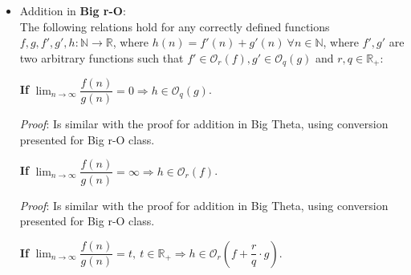 \begin{itemize}
\begin{proof}
$ \lim_{n\to\infty} \dfrac{f(n)}{g(n)} = t \Rightarrow \lim_{n\to\infty} \dfrac{f'(n)}{g'(n)} = t \cdot \dfrac{r}{q} = t' \Rightarrow \lim_{n\to\infty} \dfrac{g'(n) + f'(n)}{g'(n)} = t' + 1 $ and using the result from asymptotic analysis section, we have $ g'(n) + f'(n) = h(n) \in \Theta_{t' + 1}(g')$. \\ 
Using reflexivity property, $ h(n) \in \Theta_{t' + 1} (q \cdot g)$. \\
Using the conversion technique, we have $ h(n) \in \Theta_{r}( \dfrac{1}{r} \cdot t \cdot \dfrac{r}{q} + 1) \cdot q \cdot g)$. \\
By swapping back $t$, asymptotically, we can establish: $ h(n) \in \Theta_{r}( \dfrac{1}{r} \cdot ( \dfrac{f(n)}{g(n)} \cdot \dfrac{r}{q} + 1) \cdot q \cdot g)$ \\
Therefore $ h \in \Theta_{r} \left( f + \dfrac{r}{q} \cdot g \right) $.
\end{proof} 



  \item Addition in \textbf{Big r-O}: \\
The following relations hold for any correctly defined functions $f, g, f', g', h:\mathbb{N}\longrightarrow\mathbb{R}$, where $ h(n) = f'(n) + g'(n)\  \forall n \in \mathbb{N} $, where $f',g'$ are two arbitrary functions such that $ f' \in \mathcal{O}_{r}(f),  g' \in \mathcal{O}_{q}(g) $ and $r,q \in \mathbb{R}_{+}$:  
\begin{theorem} 
    \textbf{If} $ \lim_{n\to\infty} \dfrac{f(n)}{g(n)} = 0 \Rightarrow  h \in \mathcal{O}_{q}(g) $. \\
\end{theorem} 

\textit{Proof}: 
Is similar with the proof for addition in Big Theta, using conversion presented for Big r-O class.
\hfill\break

\begin{theorem} 
  \textbf{If} $ \lim_{n\to\infty} \dfrac{f(n)}{g(n)} = \infty \Rightarrow  h \in \mathcal{O}_{r}(f) $. \\
\end{theorem} 

  \textit{Proof}:
Is similar with the proof for addition in Big Theta, using conversion presented for Big r-O class.
\hfill\break
\begin{theorem} 
  \textbf{If} $ \lim_{n\to\infty} \dfrac{f(n)}{g(n)} = t, \ t \in \mathbb{R}_{+} \Rightarrow  h \in \mathcal{O}_{r} \left( f + \dfrac{r}{q} \cdot g \right) $. \\
\end{theorem} 


\end{itemize}
